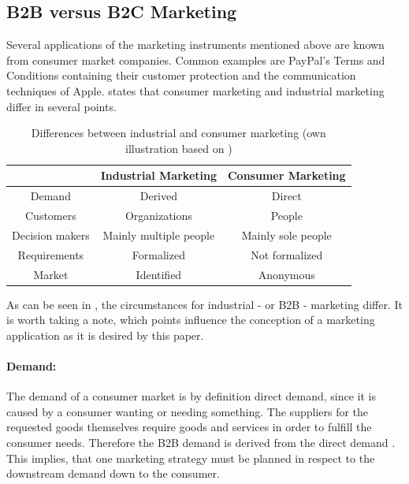 \subsection{B2B versus B2C Marketing}

Several applications of the marketing instruments mentioned above are known from consumer market companies. Common examples are PayPal's Terms and Conditions containing their customer protection \parencite[see][]{PayPal} and the communication techniques of Apple. \textcite[20-21]{Backhaus.2015b} states that consumer marketing and industrial marketing differ in several points.


\begin{table}[H]
\begin{center}
\begin{tabular}{|c|c|c|}
\hline 
 & Industrial Marketing & Consumer Marketing \\ 
\hline 
Demand & Derived & Direct \\ 
\hline 
Customers & Organizations & People \\ 
\hline 
Decision makers & Mainly multiple people & Mainly sole people \\ 
\hline 
Requirements & Formalized & Not formalized \\ 
\hline 
Market & Identified & Anonymous \\ 
\hline 
\end{tabular} 
\end{center}
\caption[Differences between industrial and consumer marketing]{Differences between industrial and consumer marketing (own illustration based on \protect\cite[21]{Backhaus.2015b})}
\label{tab:marketingdiff}
\end{table}


As can be seen in , the circumstances for industrial - or B2B - marketing differ. It is worth taking a note, which points influence the conception of a marketing application as it is desired by this paper. 

\paragraph*{Demand:} 
The demand of a consumer market is by definition direct demand, since it is caused by a consumer wanting or needing something. The suppliers for the requested goods themselves require goods and services in order to fulfill the consumer needs. Therefore the B2B demand is derived from the direct demand \parencite[cf.][21]{Backhaus.2015b}. This implies, that one marketing strategy must be planned in respect to the downstream demand down to the consumer. 

